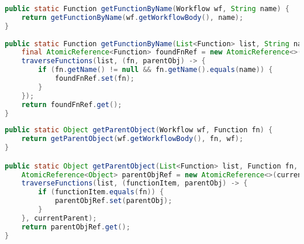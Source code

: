 \begin{appendix}
\begin{lstlisting}[language=Java,caption={get a function by its name},label=lst:getFuncByName]
public static Function getFunctionByName(Workflow wf, String name) {
    return getFunctionByName(wf.getWorkflowBody(), name);
}
    
public static Function getFunctionByName(List<Function> list, String name) {
    final AtomicReference<Function> foundFnRef = new AtomicReference<>();
    traverseFunctions(list, (fn, parentObj) -> {
        if (fn.getName() != null && fn.getName().equals(name)) {
            foundFnRef.set(fn);
        }
    });
    return foundFnRef.get();
}
\end{lstlisting}

\begin{lstlisting}[language=Java,caption={get a function's parent object},label=lst:getParentObject]
public static Object getParentObject(Workflow wf, Function fn) {
    return getParentObject(wf.getWorkflowBody(), fn, wf);
}

public static Object getParentObject(List<Function> list, Function fn, Object currentParent) {
    AtomicReference<Object> parentObjRef = new AtomicReference<>(currentParent);
    traverseFunctions(list, (functionItem, parentObj) -> {
        if (functionItem.equals(fn)) {
            parentObjRef.set(parentObj);
        }
    }, currentParent);
    return parentObjRef.get();
}
\end{lstlisting}

\clearpage


\end{appendix}
